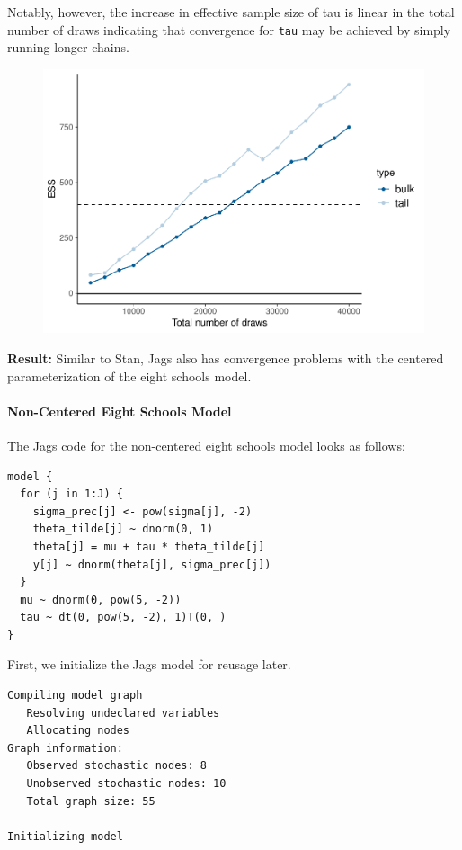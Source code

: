 \documentclass[american,]{article}
\let\oldparagraph\paragraph
\renewcommand{\paragraph}[1]{\oldparagraph{#1}\mbox{}}
\begin{document}
Notably, however, the increase in effective sample size of tau is linear
in the total number of draws indicating that convergence for
\texttt{tau} may be achieved by simply running longer chains.

\begin{figure}[t]
  \centering
  \includegraphics[width=0.6\linewidth]{graphics/change-ess-jags-cp-tau-longer-1.pdf}
\end{figure}

\textbf{Result:} Similar to Stan, Jags also has convergence problems
with the centered parameterization of the eight schools model.

\hypertarget{non-centered-eight-schools-model-2}{%
\paragraph{Non-Centered Eight Schools
Model}\label{non-centered-eight-schools-model-2}}

The Jags code for the non-centered eight schools model looks as follows:

\begin{verbatim}
model {
  for (j in 1:J) {
    sigma_prec[j] <- pow(sigma[j], -2)
    theta_tilde[j] ~ dnorm(0, 1)
    theta[j] = mu + tau * theta_tilde[j]
    y[j] ~ dnorm(theta[j], sigma_prec[j])
  }
  mu ~ dnorm(0, pow(5, -2))
  tau ~ dt(0, pow(5, -2), 1)T(0, )
}
\end{verbatim}

First, we initialize the Jags model for reusage later.

\begin{verbatim}
Compiling model graph
   Resolving undeclared variables
   Allocating nodes
Graph information:
   Observed stochastic nodes: 8
   Unobserved stochastic nodes: 10
   Total graph size: 55

Initializing model
\end{verbatim}
\end{document}

